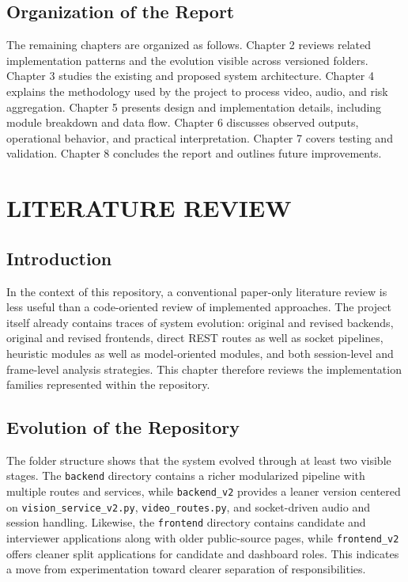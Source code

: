 \documentclass[12pt,a4paper]{extreport}
\begin{document}
\section{Organization of the Report}
The remaining chapters are organized as follows. Chapter 2 reviews related implementation patterns and the evolution visible across versioned folders. Chapter 3 studies the existing and proposed system architecture. Chapter 4 explains the methodology used by the project to process video, audio, and risk aggregation. Chapter 5 presents design and implementation details, including module breakdown and data flow. Chapter 6 discusses observed outputs, operational behavior, and practical interpretation. Chapter 7 covers testing and validation. Chapter 8 concludes the report and outlines future improvements.

\chapter{LITERATURE REVIEW}
\section{Introduction}
In the context of this repository, a conventional paper-only literature review is less useful than a code-oriented review of implemented approaches. The project itself already contains traces of system evolution: original and revised backends, original and revised frontends, direct REST routes as well as socket pipelines, heuristic modules as well as model-oriented modules, and both session-level and frame-level analysis strategies. This chapter therefore reviews the implementation families represented within the repository.

\section{Evolution of the Repository}
The folder structure shows that the system evolved through at least two visible stages. The \texttt{backend} directory contains a richer modularized pipeline with multiple routes and services, while \texttt{backend\_v2} provides a leaner version centered on \texttt{vision\_service\_v2.py}, \texttt{video\_routes.py}, and socket-driven audio and session handling. Likewise, the \texttt{frontend} directory contains candidate and interviewer applications along with older public-source pages, while \texttt{frontend\_v2} offers cleaner split applications for candidate and dashboard roles. This indicates a move from experimentation toward clearer separation of responsibilities.
\end{document}
